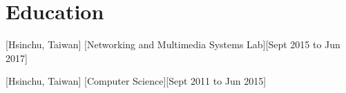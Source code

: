 \documentclass{article}
\begin{document}
\section{Education}
[Hsinchu, Taiwan]
[Networking and Multimedia Systems Lab][Sept 2015 to Jun 2017]


[Hsinchu, Taiwan]
[Computer Science][Sept 2011 to Jun 2015]

\end{document}
